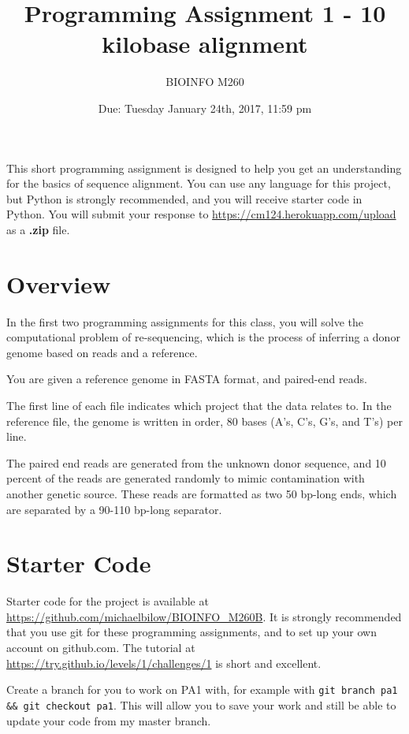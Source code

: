 \documentclass{article}
\begin{document}
\title{Programming Assignment 1 - 10 kilobase alignment}

\author{BIOINFO M260}

\date{Due: Tuesday January 24th, 2017, 11:59 pm}

\maketitle

This short programming assignment is designed to help you get an
understanding for the basics of sequence alignment. You can use any language
for this project, but Python is strongly recommended, and you will receive starter code in Python. You will submit your response to \url{https://cm124.herokuapp.com/upload} as a \textbf{.zip} file.

\section*{Overview}
In the first two programming assignments for this class, you will solve the computational problem of re-sequencing, which is the process of inferring a donor genome based on reads and a reference. 

You are given a reference genome in FASTA format, and paired-end reads.

The first line of each file indicates which project that the data relates to. In the reference file, the genome is written in order, 80 bases (A's, C's, G's, and T's) per line.

The paired end reads are generated from the unknown donor sequence, and 10 percent of the reads are generated randomly to mimic contamination with another genetic source. These reads are formatted as two 50 bp-long ends, which are separated by a 90-110 bp-long separator. 

\section*{Starter Code}

Starter code for the project is available at \url{https://github.com/michaelbilow/BIOINFO_M260B}. It is strongly recommended that you use git for these programming assignments, and to set up your own account on github.com. The tutorial at \url{https://try.github.io/levels/1/challenges/1} is short and excellent.

Create a branch for you to work on PA1 with, for example with \verb!git branch pa1 && git checkout pa1!. This will allow you to save your work and still be able to update your code from my master branch.
\end{document}
